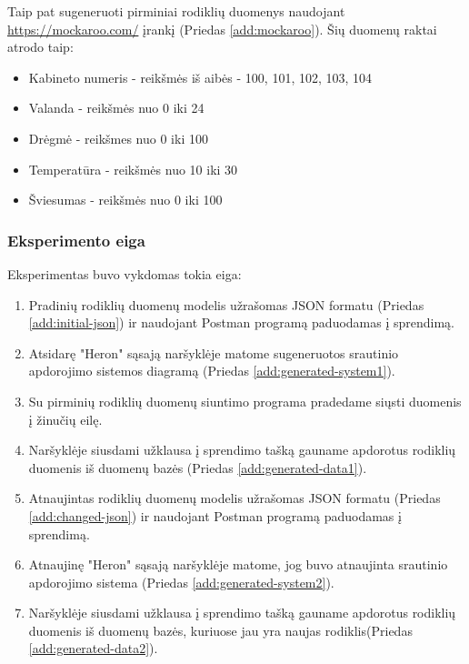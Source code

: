 \documentclass{VUMIFPSbakalaurinis}
\begin{document}
\noindent Taip pat sugeneruoti pirminiai rodiklių duomenys naudojant \url{https://mockaroo.com/} įrankį (Priedas \ref{add:mockaroo}). Šių duomenų raktai atrodo taip:
\begin{itemize}
    \item Kabineto numeris - reikšmės iš aibės - 100, 101, 102, 103, 104
    \item Valanda - reikšmės nuo 0 iki 24
    \item Drėgmė - reikšmes nuo 0 iki 100
    \item Temperatūra - reikšmės nuo 10 iki 30
    \item Šviesumas - reikšmės nuo 0 iki 100 
\end{itemize}

\subsubsection{Eksperimento eiga}

Eksperimentas buvo vykdomas tokia eiga:
\begin{enumerate}
    \item Pradinių rodiklių duomenų modelis užrašomas JSON formatu (Priedas \ref{add:initial-json}) ir naudojant Postman programą paduodamas į sprendimą.
    \item Atsidarę "Heron" sąsają naršyklėje matome sugeneruotos srautinio apdorojimo sistemos diagramą (Priedas \ref{add:generated-system1}).
    \item Su pirminių rodiklių duomenų siuntimo programa pradedame siųsti duomenis į žinučių eilę.
    \item Naršyklėje siusdami užklausa į sprendimo tašką gauname apdorotus rodiklių duomenis iš duomenų bazės (Priedas \ref{add:generated-data1}).
    \item Atnaujintas rodiklių duomenų modelis užrašomas JSON formatu (Priedas \ref{add:changed-json}) ir naudojant Postman programą paduodamas į sprendimą.
    \item Atnaujinę "Heron" sąsają naršyklėje matome, jog buvo atnaujinta srautinio apdorojimo sistema (Priedas \ref{add:generated-system2}).
    \item Naršyklėje siusdami užklausa į sprendimo tašką gauname apdorotus rodiklių duomenis iš duomenų bazės, kuriuose jau yra naujas rodiklis(Priedas \ref{add:generated-data2}).
\end{enumerate}
\end{document}
